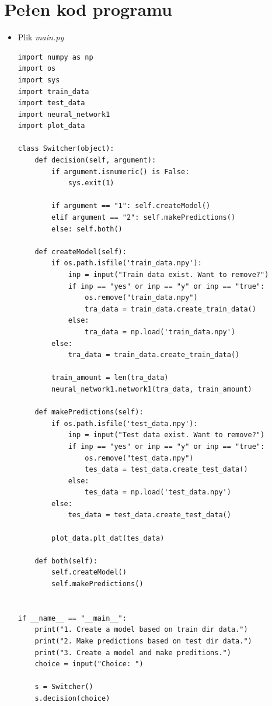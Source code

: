 \documentclass[12pt,a4paper]{article}
\begin{document}
	\newpage
	\section{Pełen kod programu}
	\begin{itemize}
    \item Plik \textit{main.py}
	{\fontsize{9}{10}\selectfont
    	\begin{verbatim}
import numpy as np
import os
import sys
import train_data
import test_data
import neural_network1
import plot_data

class Switcher(object):
    def decision(self, argument):
        if argument.isnumeric() is False:
            sys.exit(1)
    
        if argument == "1": self.createModel()
        elif argument == "2": self.makePredictions()
        else: self.both()
    
    def createModel(self):
        if os.path.isfile('train_data.npy'):
            inp = input("Train data exist. Want to remove?")
            if inp == "yes" or inp == "y" or inp == "true":
                os.remove("train_data.npy")
                tra_data = train_data.create_train_data()
            else:
                tra_data = np.load('train_data.npy')
        else:
            tra_data = train_data.create_train_data()
    
        train_amount = len(tra_data)
        neural_network1.network1(tra_data, train_amount)
    
    def makePredictions(self):
        if os.path.isfile('test_data.npy'):
            inp = input("Test data exist. Want to remove?")
            if inp == "yes" or inp == "y" or inp == "true":
                os.remove("test_data.npy")
                tes_data = test_data.create_test_data()
            else:
                tes_data = np.load('test_data.npy')
        else:
            tes_data = test_data.create_test_data()

        plot_data.plt_dat(tes_data)
    
    def both(self):
        self.createModel()
        self.makePredictions()
    
    
if __name__ == "__main__":
    print("1. Create a model based on train dir data.")
    print("2. Make predictions based on test dir data.")
    print("3. Create a model and make preditions.")
    choice = input("Choice: ")
    
    s = Switcher()
    s.decision(choice)
    	\end{verbatim}
    }
    

\end{itemize}
\end{document}
